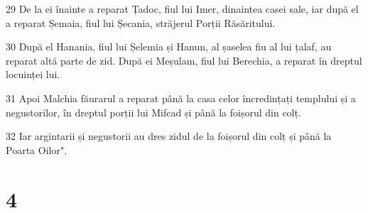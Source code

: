 \par 29 De la ei înainte a reparat Țadoc, fiul lui Imer, dinaintea casei sale, iar după el a reparat Șemaia, fiul lui Șecania, străjerul Porții Răsăritului.
\par 30 După el Hanania, fiul lui Șelemia și Hanun, al șaselea fiu al lui țalaf, au reparat altă parte de zid. După ei Meșulam, fiul lui Berechia, a reparat în dreptul locuinței lui.
\par 31 Apoi Malchia făurarul a reparat până la casa celor încredințați templului și a negustorilor, în dreptul porții lui Mifcad și până la foișorul din colț.
\par 32 Iar argintarii și negustorii au dres zidul de la foișorul din colț și până la Poarta Oilor".

\chapter{4}

